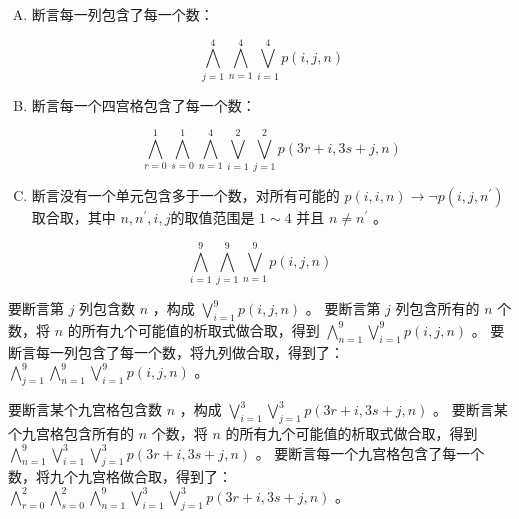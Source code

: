 {{\begin{practices}
\begin{enumerate}[A.]
{                    \[
                        \bigwedge^{4}_{i = 1}\bigwedge^{4}_{n = 1}\bigvee^{4}_{j = 1} p(i, j, n)
                    \]
                }
                \item
                {
                    断言每一列包含了每一个数：

                    \[
                        \bigwedge^{4}_{j = 1}\bigwedge^{4}_{n = 1}\bigvee^{4}_{i = 1} p(i, j, n)
                    \]
                }
                \item
                {
                    断言每一个四宫格包含了每一个数：

                    \[
                        \bigwedge^{1}_{r = 0}\bigwedge^{1}_{s = 0}\bigwedge^{4}_{n = 1}\bigvee^{2}_{i = 1}\bigvee^{2}_{j = 1} p(3r + i, 3s + j, n)
                    \]
                }
                \item
                {
                    断言没有一个单元包含多于一个数，对所有可能的 $p(i, i, n) \rightarrow \neg p(i, j, n^{\prime})$ 取合取，其中 $n, n^{\prime}, i, j$的取值范围是 $1 \sim 4$ 并且 $n \neq n^{\prime}$ 。
                }
            \end{enumerate}
        \end{practices}

        \begin{practices}
            \[
                \bigwedge^{9}_{i = 1} \bigwedge^{9}_{j = 1} \bigvee^{9}_{n = 1} p(i, j, n)
            \]
        \end{practices}

        \begin{practices}
            要断言第 $j$ 列包含数 $n$ ，构成 $\bigvee\limits^{9}_{i = 1} p(i, j, n)$ 。
            要断言第 $j$ 列包含所有的 $n$ 个数，将 $n$ 的所有九个可能值的析取式做合取，得到 $\bigwedge\limits^{9}_{n = 1} \bigvee\limits^{9}_{i = 1} p(i, j, n)$ 。
            要断言每一列包含了每一个数，将九列做合取，得到了： $\bigwedge\limits^{9}_{j = 1} \bigwedge\limits^{9}_{n = 1} \bigvee\limits^{9}_{i = 1} p(i, j, n)$ 。
        \end{practices}

        \begin{practices}
            要断言某个九宫格包含数 $n$ ，构成 $\bigvee\limits^{3}_{i = 1}\bigvee\limits^{3}_{j = 1} p(3r + i, 3s + j, n)$ 。
            要断言某个九宫格包含所有的 $n$ 个数，将 $n$ 的所有九个可能值的析取式做合取，得到 $\bigwedge\limits^{9}_{n = 1}\bigvee\limits^{3}_{i = 1}\bigvee\limits^{3}_{j = 1} p(3r + i, 3s + j, n)$ 。
            要断言每一个九宫格包含了每一个数，将九个九宫格做合取，得到了： $\bigwedge\limits^{2}_{r = 0}\bigwedge\limits^{2}_{s = 0}\bigwedge\limits^{9}_{n = 1}\bigvee\limits^{3}_{i = 1}\bigvee\limits^{3}_{j = 1} p(3r + i, 3s + j, n)$ 。
        \end{practices}
    }
}
